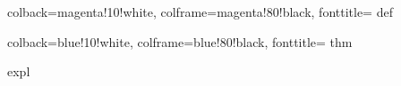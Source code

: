 \usepackage{amsmath}
\usepackage[italian]{babel}
\usepackage[a4paper,top=2cm,bottom=2cm,left=3cm,right=3cm,marginparwidth=1.75cm]{geometry}
\usepackage[colorlinks=true, allcolors=blue]{hyperref}
\usepackage{graphicx}
\usepackage{amssymb}
\usepackage{xcolor}

\usepackage{tcolorbox}

\usepackage{pgfplots}
\pgfplotsset{compat=1.18}

{
    colback=magenta!10!white,
    colframe=magenta!80!black,
    fonttitle=\bfseries
}
{def} %

{
    colback=blue!10!white,
    colframe=blue!80!black,
    fonttitle=\bfseries
}
{thm}

{expl}